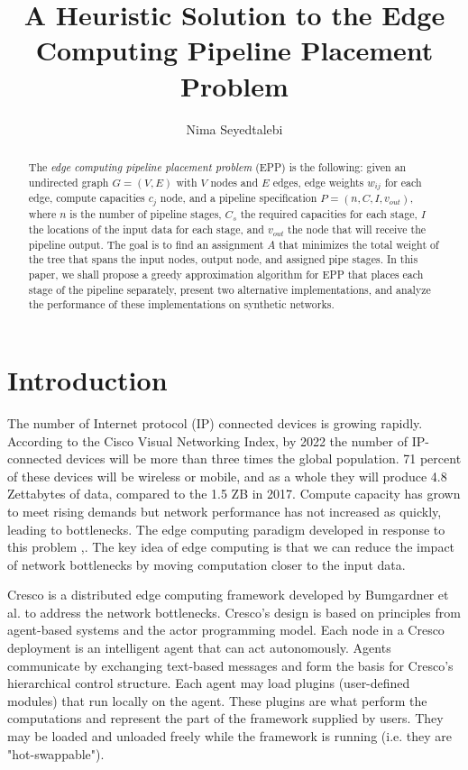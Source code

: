 \documentclass{acmart}
\author{Nima Seyedtalebi}
\title{A Heuristic Solution to the Edge Computing Pipeline Placement Problem}
\begin{document}
	\maketitle
	\doublespacing
	\begin{abstract}
		The \textit{edge computing pipeline placement problem} (EPP) is the following: given an undirected graph $G=(V,E)$ with $V$ nodes and $E$ edges, edge weights $w_{ij}$ for each edge, compute capacities $c_{j}$ node, and a pipeline specification $P = (n,C,I,v_{out})$, where  $n$ is the number of pipeline stages, $C_{s}$ the required capacities for each stage, $I$ the locations of the input data for each stage, and $v_{out}$ the node that will receive the pipeline output. The goal is to find an assignment $A$ that minimizes the total weight of the tree that spans the input nodes, output node, and assigned pipe stages. In this paper, we shall propose a greedy approximation algorithm for EPP that places each stage of the pipeline separately, present two alternative implementations, and analyze the performance of these implementations on synthetic networks.
	\end{abstract}
	
	\section{Introduction}
	The number of Internet protocol (IP) connected devices is growing rapidly. According to the Cisco Visual Networking Index, by 2022 the number of IP-connected devices will be more than three times the global population. 71 percent of these devices will be wireless or mobile, and as a whole they will produce 4.8 Zettabytes of data, compared to the 1.5 ZB in 2017.\cite{ciscoVNI} Compute capacity has grown to meet rising demands but network performance has not increased as quickly, leading to bottlenecks. The edge computing paradigm developed in response to this problem \cite{edgeEmerge},\cite{edgePromise}. The key idea of edge computing is that we can reduce the impact of network bottlenecks by moving computation closer to the input data.
	
	Cresco is a distributed edge computing framework developed by Bumgardner et al.\cite{bumgardner2016cresco} to address the network bottlenecks. Cresco's design is based on principles from agent-based systems and the actor programming model. Each node in a Cresco deployment is an intelligent agent that can act autonomously. Agents communicate by exchanging text-based messages and form the basis for Cresco's hierarchical control structure. Each agent may load plugins (user-defined modules) that run locally on the agent. These plugins are what perform the computations and represent the part of the framework supplied by users. They may be loaded and unloaded freely while the framework is running (i.e. they are "hot-swappable").
	
\end{document}
